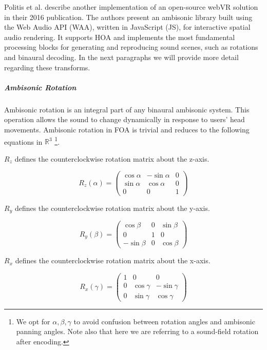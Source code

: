 Politis et al. \cite{politis2016jsambisonics} describe another implementation of an open-source webVR solution in their 2016 publication. The authors present an ambisonic library built using the Web Audio API (WAA), written in JavaScript (JS), for interactive spatial audio rendering. It supports HOA and implements the most fundamental processing blocks for generating and reproducing sound scenes, such as rotations and binaural decoding. In the next paragraphs we will provide more detail regarding these transforms. 

\subparagraph{Ambisonic Rotation}

Ambisonic rotation is an integral part of any binaural ambisonic system. This operation allows the sound to change dynamically in response to users' head movements. Ambisonic rotation in FOA is trivial and reduces to the following equations in $\mathbb{R}^{3}$ \cite{kronlachner2014spatial}\footnote{We opt for $\alpha, \beta, \gamma$ to avoid confusion between rotation angles and ambisonic panning angles. Note also that here we are referring to a sound-field rotation after encoding.}. 

$R_z$ defines the counterclockwise rotation matrix about the z-axis.

\begin{equation}
R_{z}(\alpha)=\left(\begin{array}{ccc}
\cos \alpha & -\sin \alpha & 0 \\
\sin \alpha & \cos \alpha & 0 \\
0 & 0 & 1
\end{array}\right)
\end{equation}

$R_y$ defines the counterclockwise rotation matrix about the y-axis.

\begin{equation}
R_{y}(\beta)=\left(\begin{array}{ccc}
\cos \beta & 0 & \sin \beta \\
0 & 1 & 0 \\
-\sin \beta & 0 & \cos \beta
\end{array}\right)
\end{equation}

$R_x$ defines the counterclockwise rotation matrix about the x-axis.

\begin{equation}
R_{x}(\gamma)=\left(\begin{array}{ccc}
1 & 0 & 0 \\
0 & \cos \gamma & -\sin \gamma \\
0 & \sin \gamma & \cos \gamma
\end{array}\right)
\end{equation}

